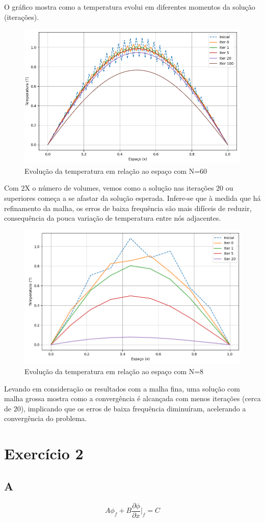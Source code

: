 \documentclass[]{article}
\begin{document}
O gráfico mostra como a temperatura evolui em diferentes momentos da solução (iterações).

\begin{figure}[H]
	\centering
	\includegraphics[width=.65\textwidth]{figures/318-1-60N}
	\caption{Evolução da temperatura em relação ao espaço com N=60}
\end{figure}

Com 2X o número de volumes, vemos como a solução nas iterações 20 ou superiores começa a se afastar da solução esperada. Infere-se que à medida que há refinamento da malha, os erros de baixa frequência são mais difíceis de reduzir, consequência da pouca variação de temperatura entre nós adjacentes.

\begin{figure}[H]
	\centering
	\includegraphics[width=.65\textwidth]{figures/318-1-8N}
	\caption{Evolução da temperatura em relação ao espaço com N=8}
\end{figure}
Levando em consideração os resultados com a malha fina, uma solução com malha grossa mostra como a convergência é alcançada com menos iterações (cerca de 20), implicando que os erros de baixa frequência diminuíram, acelerando a convergência do problema.

\section*{Exercício 2}
\subsection*{A}
\begin{equation}
	A \phi_f + B \frac{\partial \phi}{\partial x} \bigg|_f = C
\end{equation}
\end{document}
